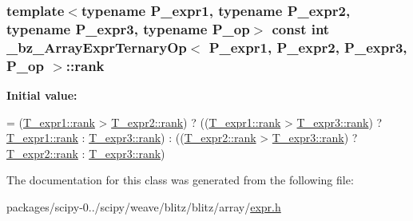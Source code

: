 \subsubsection[{rank}]{\setlength{\rightskip}{0pt plus 5cm}template$<$typename P\+\_\+expr1, typename P\+\_\+expr2, typename P\+\_\+expr3, typename P\+\_\+op$>$ const int {\bf \+\_\+bz\+\_\+\+Array\+Expr\+Ternary\+Op}$<$ P\+\_\+expr1, P\+\_\+expr2, P\+\_\+expr3, P\+\_\+op $>$\+::rank\hspace{0.3cm}{\ttfamily [static]}}\label{class__bz__ArrayExprTernaryOp_afdb88cf98214c518580dcbc5ee7ad256}
{\bfseries Initial value\+:}
\begin{DoxyCode}
= (\hyperlink{zfftnd_8c_a6cfd95afd0afebd625b889fb6e58371c}{T\_expr1::rank} > \hyperlink{zfftnd_8c_a6cfd95afd0afebd625b889fb6e58371c}{T\_expr2::rank}) 
             ? ((\hyperlink{zfftnd_8c_a6cfd95afd0afebd625b889fb6e58371c}{T\_expr1::rank} > \hyperlink{zfftnd_8c_a6cfd95afd0afebd625b889fb6e58371c}{T\_expr3::rank})
                ? \hyperlink{zfftnd_8c_a6cfd95afd0afebd625b889fb6e58371c}{T\_expr1::rank} : \hyperlink{zfftnd_8c_a6cfd95afd0afebd625b889fb6e58371c}{T\_expr3::rank})
             : ((\hyperlink{zfftnd_8c_a6cfd95afd0afebd625b889fb6e58371c}{T\_expr2::rank} > \hyperlink{zfftnd_8c_a6cfd95afd0afebd625b889fb6e58371c}{T\_expr3::rank}) 
                ? \hyperlink{zfftnd_8c_a6cfd95afd0afebd625b889fb6e58371c}{T\_expr2::rank} : \hyperlink{zfftnd_8c_a6cfd95afd0afebd625b889fb6e58371c}{T\_expr3::rank})
\end{DoxyCode}


The documentation for this class was generated from the following file\+:\begin{DoxyCompactItemize}
\item 
packages/scipy-\/0../scipy/weave/blitz/blitz/array/\hyperlink{expr_8h}{expr.\+h}\end{DoxyCompactItemize}
